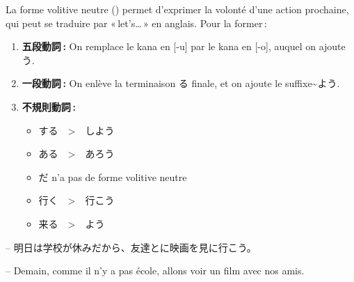     La forme volitive neutre () permet d’exprimer la volonté d’une action prochaine, qui peut se traduire par « let’s\dots » en anglais. Pour la former :

    \begin{enumerate}
        \item \textbf{五段動詞 :} On remplace le kana en [-u] par le kana en [-o], auquel on ajoute う.
        \item \textbf{一段動詞 :} On enlève la terminaison る finale, et on ajoute le suffixe\~{}よう.
        \item \textbf{不規則動詞 :}
          \begin{itemize}
              \item する　>　しよう
              \item ある　>　あろう
              \item だ n'a pas de forme volitive neutre
              \item 行く　>　行こう
              \item 来る　>　よう
          \end{itemize}
    \end{enumerate}

    \begin{tcolorbox}
        -- 明日は学校が休みだから、友達とに映画を見に行こう。

        -- Demain, comme il n'y a pas école, allons voir un film avec nos amis.
    \end{tcolorbox}







